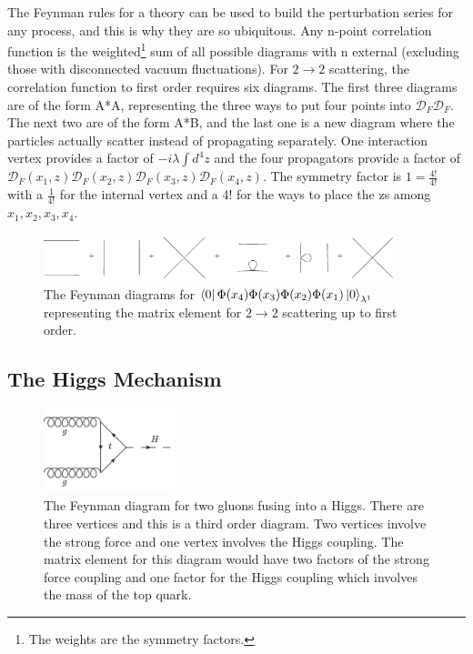 The Feynman rules for a theory can be used to build the perturbation series for any process, and this is why they are so ubiquitous. Any n-point correlation function is the weighted\footnote{The weights are the symmetry factors.} sum of all possible diagrams with n external (excluding those with disconnected vacuum fluctuations). For $2 \rightarrow 2$ scattering, the correlation function to first order requires six diagrams. The first three diagrams are of the form A*A, representing the three ways to put four points into $\mathcal{D}_F\mathcal{D}_F$. The next two are of the form A*B, and the last one is a new diagram where the particles actually scatter instead of propagating separately. One interaction vertex provides a factor of $-i\lambda\int d^4z$ and the four propagators provide a factor of $\mathcal{D}_F(x_1,z)\mathcal{D}_F(x_2,z)\mathcal{D}_F(x_3,z)\mathcal{D}_F(x_4,z)$. The symmetry factor is $1 = \frac{4!}{4!}$ with a $\frac{1}{4!}$ for the internal vertex and a 4! for the ways to place the zs among $x_1, x_2, x_3, x_4$.

\begin{figure}[h!]
  \centering
  \includegraphics[width=4in]{images/phi4_2-2_scattering.pdf}
  \caption
   {The Feynman diagrams for $\bra{0}\Phi(x_4)\Phi(x_3)\Phi(x_2)\Phi(x_1)\ket{0}_{\lambda^1}$ representing the matrix element for $2\rightarrow 2$ scattering up to first order.}
  \label{fig:feyn2-2}
\end{figure}



\subsection{The Higgs Mechanism}

\begin{figure}[h!]
  \centering
  \includegraphics[width=1.5in]{images/ggf.png}
  \caption
   {The Feynman diagram for two gluons fusing into a Higgs. There are three vertices and this is a third order diagram. Two vertices involve the strong force and one vertex involves the Higgs coupling. The matrix element for this diagram would have two factors of the strong force coupling and one factor for the Higgs coupling which involves the mass of the top quark.}
  \label{fig:feynggf}
\end{figure}

